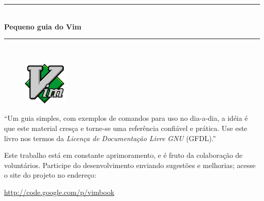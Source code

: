 \documentclass[10pt,a4paper,openany]{book}
\newcommand{\titulo}{\Huge \sc Pequeno guia do Vim}
\begin{document}
{}

\begin{titlepage}
 \begin{flushleft}
	\vspace{2mm}
	\vspace{2mm}
	\vspace{2mm}
 \end{flushleft}
\begin{center}
	\rule{12cm}{1mm} \\ \vspace{2mm}
	{\LARGE{\bf{\titulo}}} \\
	\vspace{-1mm}
	\rule{12cm}{1mm} \\


  \vspace{2cm}
  \begin{figure}[h]
    \center
    \includegraphics{img/vimlogo.png}
    \label{logodovim}
\end{figure}

	\vspace{3cm}
	\begin{flushright}
	\begin{minipage}[t]{8cm}
	       ``Um guia simples, com exemplos de comandos
			 para uso no dia-a-dia, a idéia é que este
			 material cresça e torne-se uma referência confiável
			 e prática. Use este livro nos termos da {\em Licença de Documentação Livre GNU} (GFDL).'' \\
          \par Este trabalho está em constante aprimoramento, e é fruto da
          colaboração de voluntários. Participe do desenvolvimento enviando sugestões e
          melhorias; acesse o site do projeto no endereço: \\
\begin{center}
          \url{http://code.google.com/p/vimbook}
\end{center}
        

\end{minipage}
\end{flushright}
\end{center}
\end{titlepage}
\end{document}
